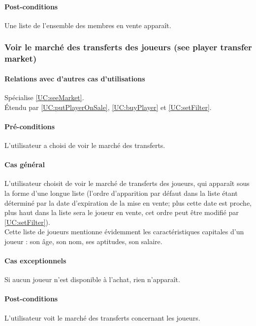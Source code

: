 \paragraph{Post-conditions}
\begin{list}{}{\leftmargin=1.5em}
\item{Une liste de l'ensemble des membres en vente apparaît. }
\end{list}

\subsubsection{Voir le marché des transferts des joueurs (see player transfer market)}
\label{UC:seePlayerMarket}
\paragraph{Relations avec d'autres cas d'utilisations}
Spécialise \ref{UC:seeMarket}.\\
Étendu par \ref{UC:putPlayerOnSale}, \ref{UC:buyPlayer} et \ref{UC:setFilter}.
\paragraph{Pré-conditions}
\begin{list}{}{\leftmargin=1.5em}
\item{L'utilisateur a choisi de voir le marché des transferts.}
\end{list}
\paragraph{Cas général}
L'utilisateur choisit de voir le marché de transferts des joueurs, qui apparaît sous la forme d'une longue liste (l'ordre d'apparition par défaut dans la liste étant déterminé par la date d'expiration de la mise en vente; plus cette date est proche, plus haut dans la liste sera le joueur en vente, cet ordre peut être modifié par \ref{UC:setFilter}).\\
Cette liste de joueurs mentionne évidemment les caractéristiques capitales d'un joueur : son âge, son nom, ses aptitudes, son salaire.
\paragraph{Cas exceptionnels}
Si aucun joueur n'est disponible à l'achat, rien n'apparaît. 
\paragraph{Post-conditions}
\begin{list}{}{\leftmargin=1.5em}
\item{L'utilisateur voit le marché des transferts concernant les joueurs.}
\end{list}

